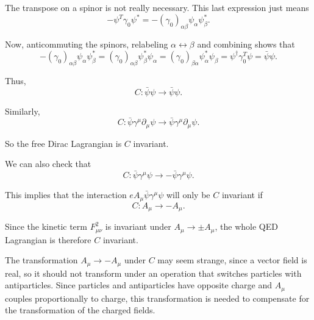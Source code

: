 \documentclass[11pt]{article}
\theoremstyle{definition}
\begin{document}
The transpose on a spinor is not really necessary. This last expression just means  
\begin{equation}
-\psi^T\gamma_0\psi^* = -(\gamma_0)_{\alpha\beta}\psi_\alpha\psi_\beta^*.
\end{equation}  

Now, anticommuting the spinors, relabeling \(\alpha \leftrightarrow \beta\) and combining shows that  
\begin{equation}
-(\gamma_0)_{\alpha\beta}\psi_\alpha\psi_\beta^* = (\gamma_0)_{\alpha\beta}\psi_\beta^*\psi_\alpha = (\gamma_0)_{\beta\alpha}\psi_\alpha^*\psi_\beta = \psi^\dagger\gamma_0^T\psi = \bar{\psi}\psi.
\end{equation}  

Thus,  
\begin{equation}
C : \bar{\psi}\psi \rightarrow \bar{\psi}\psi.
\end{equation}  

Similarly,  
\begin{equation}
C : \bar{\psi}\gamma^\mu\partial_\mu\psi \rightarrow \bar{\psi}\gamma^\mu\partial_\mu\psi.
\end{equation}  

So the free Dirac Lagrangian is \(C\) invariant.  

We can also check that  
\begin{equation}
C : \bar{\psi}\gamma^\mu\psi \rightarrow -\bar{\psi}\gamma^\mu\psi.
\end{equation}  

This implies that the interaction \(eA_\mu\bar{\psi}\gamma^\mu\psi\) will only be \(C\) invariant if  
\begin{equation}
C : A_\mu \rightarrow -A_\mu.
\end{equation}

Since the kinetic term \( F_{\mu \nu}^2 \) is invariant under \( A_\mu \to \pm A_\mu \), the whole QED Lagrangian is therefore \( C \) invariant.

The transformation \( A_\mu \to -A_\mu \) under \( C \) may seem strange, since a vector field is real, so it should not transform under an operation that switches particles with antiparticles. Since particles and antiparticles have opposite charge and \( A_\mu \) couples proportionally to charge, this transformation is needed to compensate for the transformation of the charged fields.
\end{document}
